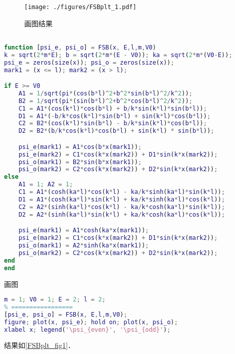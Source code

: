 
\begin{issues}
\issueDraft
\end{issues}


\begin{figure}[ht]
\centering
\texttt{[image: ./figures/FSBplt\_1.pdf]}
\caption{画图结果} \label{FSBplt_fig1}
\end{figure}

\begin{lstlisting}[language=matlab, caption=FSB.m]
% m 质量，V0 势垒，E 能量， L 势垒半宽;

function [psi_e, psi_o] = FSB(x, E,l,m,V0)
k = sqrt(2*m*E); b = sqrt(2*m*(E - V0)); ka = sqrt(2*m*(V0-E));
psi_e = zeros(size(x)); psi_o = zeros(size(x));
mark1 = (x <= l); mark2 = (x > l);

if E >= V0
    A1 = 1/sqrt(pi*(cos(b*l)^2+b^2*sin(b*l)^2/k^2));
    B2 = 1/sqrt(pi*(sin(b*l)^2+b^2*cos(b*l)^2/k^2));
    C1 = A1*(cos(k*l)*cos(b*l) + b/k*sin(k*l)*sin(b*l));
    D1 = A1*(-b/k*cos(k*l)*sin(b*l) + sin(k*l)*cos(b*l));
    C2 = B2*(cos(k*l)*sin(b*l) - b/k*sin(k*l)*cos(b*l));
    D2 = B2*(b/k*cos(k*l)*cos(b*l) + sin(k*l) * sin(b*l));

    psi_e(mark1) = A1*cos(b*x(mark1));
    psi_e(mark2) = C1*cos(k*x(mark2)) + D1*sin(k*x(mark2));
    psi_o(mark1) = B2*sin(b*x(mark1));
    psi_o(mark2) = C2*cos(k*x(mark2)) + D2*sin(k*x(mark2));
else
    A1 = 1; A2 = 1;
    C1 = A1*(cosh(ka*l)*cos(k*l) - ka/k*sinh(ka*l)*sin(k*l));
    D1 = A1*(cosh(ka*l)*sin(k*l) + ka/k*sinh(ka*l)*cos(k*l));
    C2 = A2*(sinh(ka*l)*cos(k*l) - ka/k*cosh(ka*l)*sin(k*l));
    D2 = A2*(sinh(ka*l)*sin(k*l) + ka/k*cosh(ka*l)*cos(k*l));

    psi_e(mark1) = A1*cosh(ka*x(mark1));
    psi_e(mark2) = C1*cos(k*x(mark2)) + D1*sin(k*x(mark2));
    psi_o(mark1) = A2*sinh(ka*x(mark1));
    psi_o(mark2) = C2*cos(k*x(mark2)) + D2*sin(k*x(mark2));
end
end
\end{lstlisting}

画图
\begin{lstlisting}[language=matlab]
% === 设置参数 =====
m = 1; V0 = 1; E = 2; l = 2;
% =================
[psi_e, psi_o] = FSB(x, E,l,m,V0);
figure; plot(x, psi_e); hold on; plot(x, psi_o);
xlabel x; legend('\psi_{even}', '\psi_{odd}');
\end{lstlisting}
结果如\autoref{FSBplt_fig1}．
